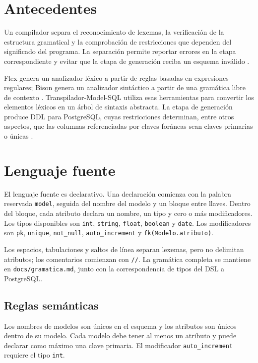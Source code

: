 \documentclass[runningheads]{llncs}
\begin{document}
\section{Antecedentes}

Un compilador separa el reconocimiento de lexemas, la verificación de la
estructura gramatical y la comprobación de restricciones que dependen del
significado del programa. La separación permite reportar errores en la etapa
correspondiente y evitar que la etapa de generación reciba un esquema inválido
\cite{aho}.

Flex genera un analizador léxico a partir de reglas basadas en expresiones
regulares; Bison genera un analizador sintáctico a partir de una gramática libre
de contexto \cite{flex,bison}. Transpilador-Model-SQL utiliza esas herramientas
para convertir los elementos léxicos en un árbol de sintaxis abstracta. La etapa
de generación produce DDL para PostgreSQL,
cuyas restricciones determinan, entre otros aspectos, que las columnas
referenciadas por claves foráneas sean claves primarias o únicas
\cite{postgresql}.

\section{Lenguaje fuente}

El lenguaje fuente es declarativo. Una declaración comienza con la palabra
reservada \texttt{model}, seguida del nombre del modelo y un bloque entre llaves.
Dentro del bloque, cada atributo declara un nombre, un tipo y cero o más
modificadores. Los tipos disponibles son \texttt{int}, \texttt{string},
\texttt{float}, \texttt{boolean} y \texttt{date}. Los modificadores son
\texttt{pk}, \texttt{unique}, \texttt{not\_null}, \texttt{auto\_increment} y
\texttt{fk(Modelo.atributo)}.

Los espacios, tabulaciones y saltos de línea separan lexemas, pero no delimitan
atributos; los comentarios comienzan con \texttt{//}. La gramática completa se
mantiene en \texttt{docs/gramatica.md}, junto con la correspondencia de tipos
del DSL a PostgreSQL.

\subsection{Reglas semánticas}

Los nombres de modelos son únicos en el esquema y los atributos son únicos dentro
de su modelo. Cada modelo debe tener al menos un atributo y puede declarar como
máximo una clave primaria. El modificador \texttt{auto\_increment} requiere el
tipo \texttt{int}.
\end{document}
